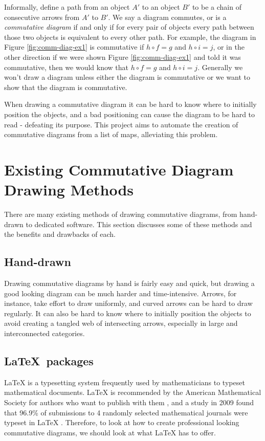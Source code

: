 \documentclass[logo,bsc,singlespacing,parskip]{infthesis}
\theoremstyle{definition}
\begin{document}
Informally, define a path from an object $A'$ to an object $B'$ to be a chain of consecutive arrows from $A'$ to $B'$. We say a diagram commutes, or is a \emph{commutative diagram} if and only if for every pair of objects every path between those two objects is equivalent to every other path. For example, the diagram in Figure \ref{fig:comm-diag-ex1} is commutative if $h \circ f = g$ and $h \circ i = j$, or in the other direction if we were shown Figure \ref{fig:comm-diag-ex1} and told it was commutative, then we would know that $h \circ f = g$ and $h \circ i = j$. Generally we won't draw a diagram unless either the diagram is commutative or we want to show that the diagram is commutative. 



When drawing a commutative diagram it can be hard to know where to initially position the objects, and a bad positioning can cause the diagram to be hard to read - defeating its purpose. This project aims to automate the creation of commutative diagrams from a list of maps, alleviating this problem.

\section{Existing Commutative Diagram Drawing Methods}\label{bkg:other}
There are many existing methods of drawing commutative diagrams, from hand-drawn to dedicated software. This section discusses some of these methods and the benefits and drawbacks of each.

\subsection{Hand-drawn}
Drawing commutative diagrams by hand is fairly easy and quick, but drawing a good looking diagram can be much harder and time-intensive. Arrows, for instance, take effort to draw uniformly, and curved arrows can be hard to draw regularly. It can also be hard to know where to initially position the objects to avoid creating a tangled web of intersecting arrows, especially in large and interconnected categories. 

\subsection{\LaTeX\ packages}
\LaTeX{} is a typesetting system frequently used by mathematicians to typeset mathematical documents. \LaTeX{} is recommended by the American Mathematical Society for authors who want to publish with them \cite{AMSlatexrec}, and a study in 2009 found that 96.9\% of submissions to 4 randomly selected mathematical journals were typeset in \LaTeX{} \cite{brischoux2009don}. Therefore, to look at how to create professional looking commutative diagrams, we should look at what \LaTeX{} has to offer.
\end{document}
